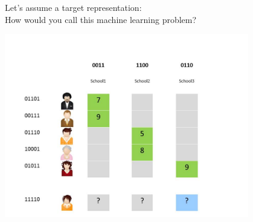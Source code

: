\documentclass[]{beamer}
\begin{document}
\begin{frame}{Let's assume a target representation: \\
How would you call this machine learning problem?}
\begin{center}
\includegraphics[width=0.8\textwidth,trim = 0 0 100 30,clip]{Figures/pictures/Slide6}
\end{center}

\end{frame}
\end{document}
